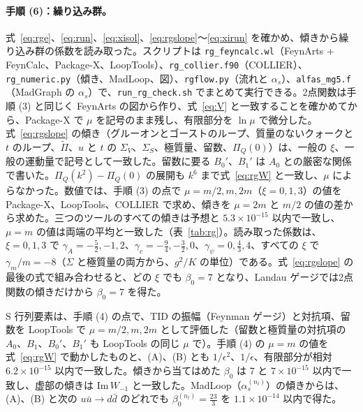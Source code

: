 \documentclass[a4paper,10pt]{ltjsarticle}
\begin{document}
\paragraph{手順 (6)：繰り込み群。}式~\eqref{eq:rge}、\eqref{eq:run}、\eqref{eq:xisol}、\eqref{eq:rgslope}〜\eqref{eq:xirun} を確かめ、傾きから繰り込み群の係数を読み取った。スクリプトは \texttt{rg\_feyncalc.wl}（FeynArts + FeynCalc、Package-X、LoopTools）、\texttt{rg\_collier.f90}（COLLIER）、\texttt{rg\_numeric.py}（傾き、MadLoop、図）、\texttt{rgflow.py}（流れと $\alpha_s$）、\texttt{alfas\_mg5.f}（MadGraph の $\alpha_s$）で、\texttt{run\_rg\_check.sh} でまとめて実行できる。2点関数は手順 (3) と同じく FeynArts の図から作り、式~\eqref{eq:V} と一致することを確かめてから、Package-X で $\mu$ を記号のまま残し、有限部分を $\ln\mu$ で微分した。式~\eqref{eq:rgslope} の傾き（グルーオンとゴーストのループ、質量のないクォークと $t$ のループ、$\tilde\Pi$、$u$ と $t$ の $\Sigma_V$、$\Sigma_S$、極質量、留数、$\Pi_Q(0)$）は、一般の $\xi$、一般の運動量で記号として一致した。留数に要る $B_0'$、$B_1'$ は $A_0$ との厳密な関係で書いた。$\Pi_Q(k^2)-\Pi_Q(0)$ の展開も $k^6$ まで式~\eqref{eq:rgW} と一致し、$\mu$ によらなかった。数値では、手順 (3) の点で $\mu=m/2,m,2m$（$\xi=0,1,3$）の値を Package-X、LoopTools、COLLIER で求め、傾きを $\mu=2m$ と $m/2$ の値の差から求めた。三つのツールのすべての傾きは予想と $5.3\times10^{-15}$ 以内で一致し、$\mu=m$ の値は両端の平均と一致した（表~\ref{tab:rg}）。読み取った係数は、$\xi=0,1,3$ で $\gamma_A=-\frac52,-1,2$、$\gamma_c=-\frac94,-\frac32,0$、$\gamma_\psi=0,\frac43,4$、すべての $\xi$ で $\gamma_m/m=-8$（$\Sigma$ と極質量の両方から、$g^2/K$ の単位）である。式~\eqref{eq:rgslope} の最後の式で組み合わせると、どの $\xi$ でも $\beta_0=7$ となり、Landau ゲージでは2点関数の傾きだけから $\beta_0=7$ を得た。

S 行列要素は、手順 (4) の点で、TID の振幅（Feynman ゲージ）と対抗項、留数を LoopTools で $\mu=m/2,m,2m$ として評価した（留数と極質量の対抗項の $A_0$、$B_1$、$B_0'$、$B_1'$ も LoopTools の同じ $\mu$ で）。手順 (4) の $\mu=m$ の値を式~\eqref{eq:rgW} で動かしたものと、(A)、(B) とも $1/\epsilon^2$、$1/\epsilon$、有限部分が相対 $6.2\times10^{-15}$ 以内で一致した。傾きから当てはめた $\beta_0$ は $7$ と $7\times10^{-15}$ 以内で一致し、虚部の傾きは $\mathrm{Im}\,W_{-1}$ と一致した。MadLoop（$\alpha_s^{(n_l)}$）の傾きからは、(A)、(B) と次の $u\bar u\to d\bar d$ のどれでも $\beta_0^{(n_l)}=\frac{23}3$ を $1.1\times10^{-14}$ 以内で得た。
\end{document}
